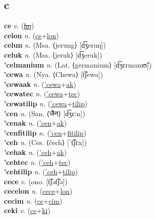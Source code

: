 \subsection{c}

\textbf{ce} \textit{v.} (\hyperref[ho]{\sout{ho}})
 \label{ce} \\
\textbf{celon} \textit{n.} (\hyperref[ce]{ce}+\hyperref[lon]{lon})
 \label{celon} \\
\textbf{celun} \textit{n.} (Msa. ⟨jerung⟩ [d͡ʒeruŋ])
 \label{celun} \\
\textbf{celuk} \textit{n.} (Msa. ⟨jeruk⟩ [d͡ʒeruk])
 \label{celuk} \\
\textbf{'celmanium} \textit{n.} (Lat. ⟨germanium⟩ [d͡ʒɛrmanɪʊ̃])
 \label{'celmanium} \\
\textbf{'cewa} \textit{n.} (Nya. ⟨Chewa⟩ [t͡ʃewa])
 \label{'cewa} \\
\textbf{'cewaak} \textit{n.} (\hyperref['cewa]{'cewa}+\hyperref[ak]{ak})
 \label{'cewaak} \\
\textbf{'cewatec} \textit{n.} (\hyperref['cewa]{'cewa}+\hyperref[tec]{tec})
 \label{'cewatec} \\
\textbf{'cewatilip} \textit{n.} (\hyperref['cewa]{'cewa}+\hyperref[tilip]{tilip})
 \label{'cewatilip} \\
\textbf{'cen} \textit{n.} (San. ⟨जैन⟩ [d͡ʒɛːn])
 \label{'cen} \\
\textbf{'cenak} \textit{n.} (\hyperref['cen]{'cen}+\hyperref[ak]{ak})
 \label{'cenak} \\
\textbf{'cenfitilip} \textit{n.} (\hyperref['cen]{'cen}+\hyperref[fitilip]{fitilip})
 \label{'cenfitilip} \\
\textbf{'ceh} \textit{n.} (Ces. ⟨čech⟩ [ˈt͡ʃɛx])
 \label{'ceh} \\
\textbf{'cehak} \textit{n.} (\hyperref['ceh]{'ceh}+\hyperref[ak]{ak})
 \label{'cehak} \\
\textbf{'cehtec} \textit{n.} (\hyperref['ceh]{'ceh}+\hyperref[tec]{tec})
 \label{'cehtec} \\
\textbf{'cehtilip} \textit{n.} (\hyperref['ceh]{'ceh}+\hyperref[tilip]{tilip})
 \label{'cehtilip} \\
\textbf{cece} \textit{v.} (ono. [t͡ʃət͡ʃə])
 \label{cece} \\
\textbf{cecelon} \textit{n.} (\hyperref[cece]{cece}+\hyperref[lon]{lon})
 \label{cecelon} \\
\textbf{cecim} \textit{n.} (\hyperref[ce]{ce}+\hyperref[cim]{cim})
 \label{cecim} \\
\textbf{ceki} \textit{v.} (\hyperref[ce]{ce}+\hyperref[ki]{ki})
